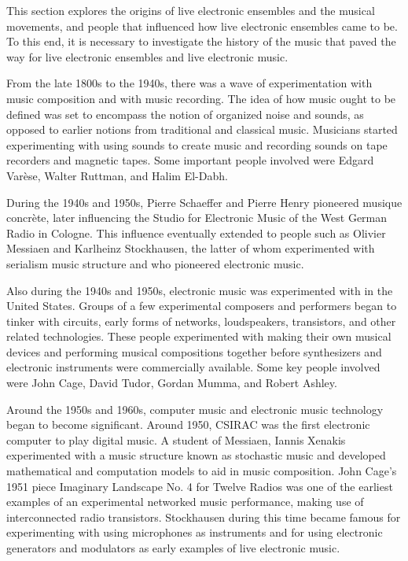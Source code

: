 \documentclass[letterpaper, 12pt]{article}
\begin{document}
This section explores the origins of live electronic ensembles and the musical movements, and people that influenced how live electronic ensembles came to be. To this end, it is necessary to investigate the history of the music that paved the way for live electronic ensembles and live electronic music.

%
From the late 1800s to the 1940s, there was a wave of experimentation with music composition and with music recording.
%
The idea of how music ought to be defined was set to encompass the notion of organized noise and sounds, as opposed to earlier notions from traditional and classical music.
%
Musicians started experimenting with using sounds to create music and recording sounds on tape recorders and magnetic tapes.
%
Some important people involved were Edgard Varèse, Walter Ruttman, and Halim El-Dabh.

%
During the 1940s and 1950s, Pierre Schaeffer and Pierre Henry pioneered musique concrète, later influencing the Studio for Electronic Music of the West German Radio in Cologne.
%
This influence eventually extended to people such as Olivier Messiaen and Karlheinz Stockhausen, the latter of whom experimented with serialism music structure and who pioneered electronic music.
%

%
Also during the 1940s and 1950s, electronic music was experimented with in the United States.
%
Groups of a few experimental composers and performers began to tinker with circuits, early forms of networks, loudspeakers, transistors, and other related technologies.
%
These people experimented with making their own musical devices and performing musical compositions together before synthesizers and electronic instruments were commercially available.
%
Some key people involved were John Cage, David Tudor, Gordan Mumma, and Robert Ashley.
%

%
Around the 1950s and 1960s, computer music and electronic music technology began to become significant.
%
Around 1950, CSIRAC was the first electronic computer to play digital music.
%
A student of Messiaen, Iannis Xenakis experimented with a music structure known as stochastic music and developed mathematical and computation models to aid in music composition.
%
John Cage’s 1951 piece Imaginary Landscape No. 4 for Twelve
Radios was one of the earliest examples of an experimental
networked music performance, making use of interconnected radio transistors.
%
Stockhausen during this time became famous for experimenting with using microphones as instruments and for using electronic generators and modulators as early examples of live electronic music.
\end{document}
